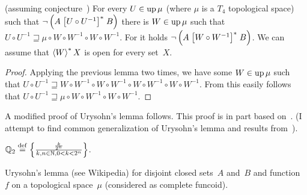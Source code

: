 \begin{lem}
  (assuming conjecture~) For every $U \in \operatorname{up} \mu$ (where $\mu$ is a $T_4$ topological space) such that
  $\neg \left( A \mathrel{\left[U \circ U^{- 1}\right]^{\ast}} B \right)$ there is $W \in \operatorname{up}\mu$
  such that $U \circ U^{- 1} \sqsupseteq \mu \circ W \circ W^{-1}\circ W \circ W^{- 1}$.
  For it holds $\neg \left( A \mathrel{\left[W \circ W^{-
  1}\right]^{\ast}} B \right)$.
  We can assume that $\left\langle W\right\rangle ^{\ast}X$ is open for every set~$X$.
\end{lem}

\begin{proof}
Applying the previous lemma two times, we have some $W\in\operatorname{up}\mu$ such that
$U\circ U^{-1} \sqsupseteq W \circ W^{-1}\circ W \circ W^{- 1} \circ W \circ W^{-1}\circ W \circ W^{- 1}$.
From this easily follows that $U \circ U^{- 1} \sqsupseteq \mu \circ W \circ W^{-1}\circ W \circ W^{- 1}$.
\end{proof}

A modified proof of Urysohn's lemma follows. This proof is in part based on~\cite{2014arXiv1410.1504B}.
(I attempt to find common generalization of Urysohn's lemma and results from~\cite{2014arXiv1410.1504B}).

$\mathbb{Q}_2 \overset{\mathrm{def}}{=} \left\{ \frac{ \frac{k}{2^n} }{k, n \in \mathbb{N}, 0 < k < 2^n }\right\}$.

\begin{thm}
Urysohn's lemma (see Wikipedia) for disjoint closed sets~$A$ and~$B$ and function~$f$ on a topological space~$\mu$
(considered as complete funcoid). 
\end{thm}


